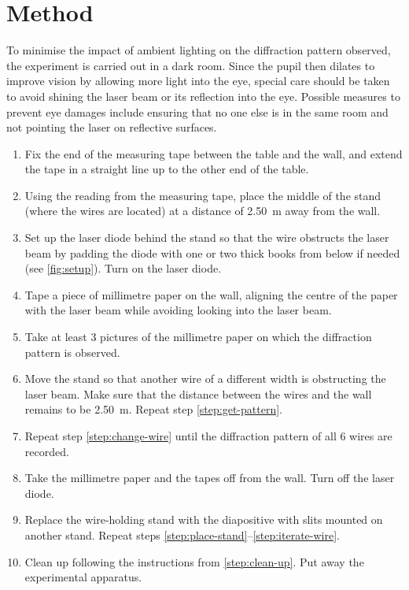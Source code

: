\documentclass[a4paper, 12pt]{article}
\begin{document}
\section*{Method}
To minimise the impact of ambient lighting on the diffraction pattern observed, the experiment is carried out in a dark room. Since the pupil then dilates to improve vision by allowing more light into the eye, special care should be taken to avoid shining the laser beam or its reflection into the eye. Possible measures to prevent eye damages include ensuring that no one else is in the same room and not pointing the laser on reflective surfaces.

\begin{enumerate}
\itemsep 0em
    \item Fix the end of the measuring tape between the table and the wall, and extend the tape in a straight line up to the other end of the table.
    \item Using the reading from the measuring tape, place the middle of the stand (where the wires are located) at a distance of \SI{2.50}{\m} away from the wall. \label{step:place-stand}
    \item Set up the laser diode behind the stand so that the wire obstructs the laser beam by padding the diode with one or two thick books from below if needed (see \cref{fig:setup}). Turn on the laser diode. \label{step:place-laser}
    \item Tape a piece of millimetre paper on the wall, aligning the centre of the paper with the laser beam while avoiding looking into the laser beam.
    \item Take at least 3 pictures of the millimetre paper on which the diffraction pattern is observed. \label{step:get-pattern}
    \item Move the stand so that another wire of a different width is obstructing the laser beam. Make sure that the distance between the wires and the wall remains to be \SI{2.50}{\m}. Repeat step \ref{step:get-pattern}. \label{step:change-wire}
    \item Repeat step \ref{step:change-wire} until the diffraction pattern of all 6 wires are recorded. \label{step:iterate-wire}
    \item Take the millimetre paper and the tapes off from the wall. Turn off the laser diode. \label{step:clean-up}
    \item Replace the wire-holding stand with the diapositive with slits mounted on another stand. Repeat steps \ref{step:place-stand}--\ref{step:iterate-wire}.
    \item Clean up following the instructions from \ref{step:clean-up}. Put away the experimental apparatus.
\end{enumerate}
\end{document}
